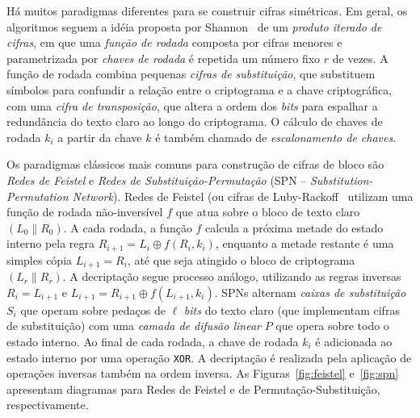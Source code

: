 Há muitos paradigmas diferentes para se construir cifras simétricas. Em geral, os algoritmos seguem a idéia proposta por Shannon~\cite{Shannon49} de um \emph{produto iterado de cifras}, em que uma \emph{função de rodada} composta por cifras menores e parametrizada por \emph{chaves de rodada} é repetida um número fixo $r$ de vezes. A função de rodada combina pequenas \emph{cifras de substituição}, que substituem símbolos para confundir a relação entre o criptograma e a chave criptográfica, com uma \emph{cifra de transposição}, que altera a ordem dos \emph{bits} para espalhar a redundância do texto claro ao longo do criptograma. O cálculo de chaves de rodada $k_i$ a partir da chave $k$ é também chamado de \emph{escalonamento de chaves}.

Os paradigmas clássicos mais comuns para construção de cifras de bloco são \emph{Redes de Feistel} e \emph{Redes de Substituição-Permutação} (SPN -- \emph{Substitution-Permutation Network}). Redes de Feistel (ou cifras de Luby-Rackoff~\cite{LubyR88} utilizam uma função de rodada não-inversível $f$ que atua sobre o bloco de texto claro $(L_0 \parallel R_0)$. A cada rodada, a função $f$ calcula a próxima metade do estado interno pela regra $R_{i+1} = L_i \oplus f(R_i, k_i)$, enquanto a metade restante é uma simples cópia $L_{i+1} = R_i$, até que seja atingido o bloco de criptograma $(L_r \parallel R_r)$. A decriptação segue processo análogo, utilizando as regras inversas $R_{i} = L_{i+1}$ e $L_{i+1} = R_{i+1} \oplus f(L_{i+1}, k_i)$. SPNs alternam \emph{caixas de substituição} $S_i$ que operam sobre pedaços de $\ell$ \emph{bits} do texto claro (que implementam cifras de substituição) com uma \emph{camada de difusão linear} $P$ que opera sobre todo o estado interno. Ao final de cada rodada, a chave de rodada $k_i$ é adicionada ao estado interno por uma operação \texttt{XOR}. A decriptação é realizada pela aplicação de operações inversas também na ordem inversa. As Figuras~\ref{fig:feistel} e~\ref{fig:spn} apresentam diagramas para Redes de Feistel e de Permutação-Substituição, respectivamente.

